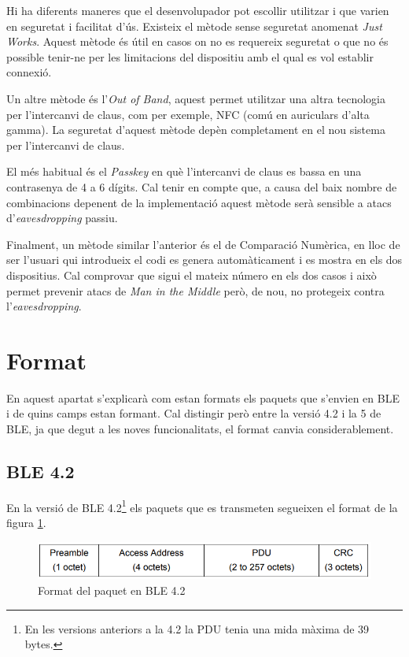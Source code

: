 Hi ha diferents maneres que el desenvolupador pot escollir utilitzar i que varien en seguretat i facilitat d'ús.
Existeix el mètode sense seguretat anomenat \textit{Just Works}.
Aquest mètode és útil en casos on no es requereix seguretat o que no és possible tenir-ne per les limitacions del dispositiu amb el qual es vol establir connexió.

Un altre mètode és l'\textit{Out of Band}, aquest permet utilitzar una altra tecnologia per l'intercanvi de claus, com per exemple, NFC (comú en auriculars d'alta gamma).
La seguretat d'aquest mètode depèn completament en el nou sistema per l'intercanvi de claus.

El més habitual és el \textit{Passkey} en què l'intercanvi de claus es bassa en una contrasenya de 4 a 6 dígits.
Cal tenir en compte que, a causa del baix nombre de combinacions depenent de la implementació aquest mètode serà sensible a atacs d'\textit{eavesdropping} passiu.

Finalment, un mètode similar l'anterior és el de Comparació Numèrica, en lloc de ser l'usuari qui introdueix el codi es genera automàticament i es mostra en els dos dispositius.
Cal comprovar que sigui el mateix número en els dos casos i això permet prevenir atacs de \textit{Man in the Middle} però, de nou, no protegeix contra l'\textit{eavesdropping}.

\section{Format}
\label{sec:format}
En aquest apartat s'explicarà com estan formats els paquets que s'envien en BLE i de quins camps estan formant.
Cal distingir però entre la versió 4.2 i la 5 de BLE, ja que degut a les noves funcionalitats, el format canvia considerablement.

\subsection{BLE 4.2}
En la versió de BLE 4.2\footnote{En les versions anteriors a la 4.2 la PDU tenia una mida màxima de 39 bytes.} els paquets que es transmeten segueixen el format de la figura \ref{fig:4_2_format}.

\begin{figure}[!h]
	\begin{center}
		\includegraphics[width=1\textwidth]{./images/Packet_format_4_2.png}
		\caption{Format del paquet en BLE 4.2 \cite{BLE_4.2_packet_format}}
		\label{fig:4_2_format}
	\end{center}
\end{figure}

